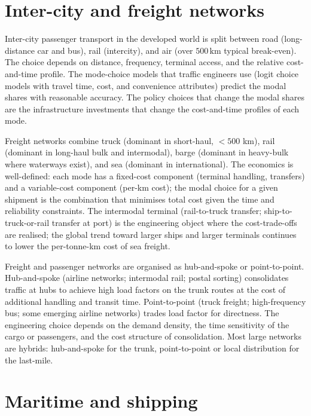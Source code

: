 \section{Inter-city and freight networks}

Inter-city passenger transport in the developed world is split between road (long-distance car and bus), rail (intercity), and air (over $500\,\text{km}$ typical break-even). The choice depends on distance, frequency, terminal access, and the relative cost-and-time profile. The mode-choice models that traffic engineers use (logit choice models with travel time, cost, and convenience attributes) predict the modal shares with reasonable accuracy. The policy choices that change the modal shares are the infrastructure investments that change the cost-and-time profiles of each mode.

Freight networks combine truck (dominant in short-haul, $<500$ km), rail (dominant in long-haul bulk and intermodal), barge (dominant in heavy-bulk where waterways exist), and sea (dominant in international). The economics is well-defined: each mode has a fixed-cost component (terminal handling, transfers) and a variable-cost component (per-km cost); the modal choice for a given shipment is the combination that minimises total cost given the time and reliability constraints. The intermodal terminal (rail-to-truck transfer; ship-to-truck-or-rail transfer at port) is the engineering object where the cost-trade-offs are realised; the global trend toward larger ships and larger terminals continues to lower the per-tonne-km cost of sea freight.

\begin{archetype}
Freight and passenger networks are organised as hub-and-spoke or point-to-point. Hub-and-spoke (airline networks; intermodal rail; postal sorting) consolidates traffic at hubs to achieve high load factors on the trunk routes at the cost of additional handling and transit time. Point-to-point (truck freight; high-frequency bus; some emerging airline networks) trades load factor for directness. The engineering choice depends on the demand density, the time sensitivity of the cargo or passengers, and the cost structure of consolidation. Most large networks are hybrids: hub-and-spoke for the trunk, point-to-point or local distribution for the last-mile.
\end{archetype}

\section{Maritime and shipping}

